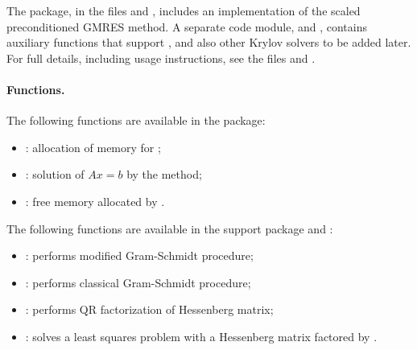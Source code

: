 %
The {\spgmr} package, in the files  and , includes an
implementation of the scaled preconditioned GMRES method.  
A separate code module,  and , contains auxiliary
functions that support {\spgmr}, and also other Krylov solvers to be
added later.  For full details, including usage instructions, see the
files  and .
 
\paragraph*{Functions.}
The following functions are available in the {\spgmr} package:  
\begin{itemize}
\item {}: allocation of memory for ;
\item {}: solution of $Ax = b$ by the {\spgmr} method;
\item {}: free memory allocated by .
\end{itemize}
%
The following functions are available in the support package 
 and :
\begin{itemize}
\item {}: performs modified Gram-Schmidt procedure;
\item {}: performs classical Gram-Schmidt procedure; 
\item {}: performs QR factorization of Hessenberg matrix;
\item {}: solves a least squares problem with a Hessenberg
       matrix factored by .
\end{itemize}
